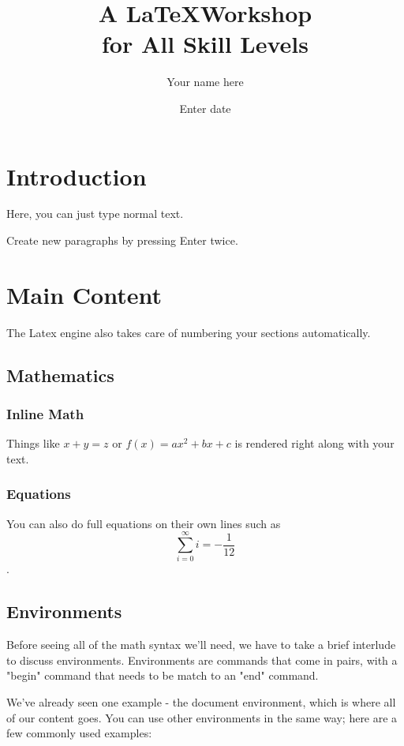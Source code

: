 \documentclass[11pt,letterpaper]{article}
\author{Your name here}
\date{Enter date}
\title{A \LaTeX Workshop \\ for All Skill Levels}
\begin{document}
\maketitle
\newpage

\tableofcontents
\newpage

\section{Introduction}
Here, you can just type normal text.

Create new paragraphs by pressing Enter twice.
\newpage

\section{Main Content}
The Latex engine also takes care of numbering your sections automatically. 

    \subsection{Mathematics}

        \subsubsection{Inline Math}

        Things like $x+y = z$ or $f(x)=ax^2 + bx + c$ is rendered right along with your text.

        \subsubsection{Equations}
        You can also do full equations on their own lines such as $$ \sum_{i=0}^\infty i = -\frac{1}{12} $$.
        
    \subsection{Environments}
    
    Before seeing all of the math syntax we'll need, we have to take a brief interlude to discuss environments. Environments are commands that come in pairs, with a "begin" command that needs to be match to an "end" command.
        
    We've already seen one example - the document environment, which is where all of our content goes. You can use other environments in the same way; here are a few commonly used examples:
    
\end{document}
